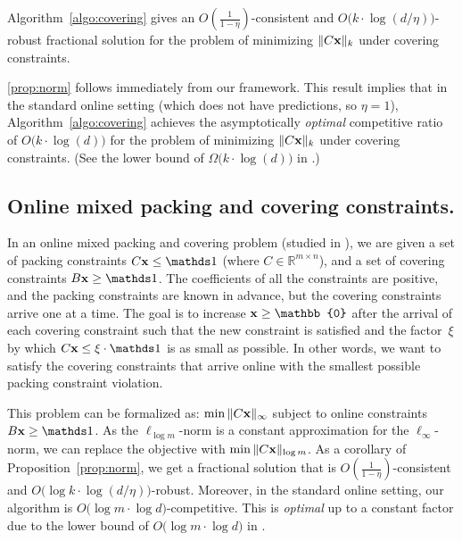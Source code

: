 \begin{proposition}	\label{prop:norm}
Algorithm~\ref{algo:covering} gives an
$O(\frac{1}{1 - \eta})$-consistent and $O\bigl( k \cdot \log (d/\eta)\bigr)$-robust fractional solution
for the problem of minimizing $\|C \mathbf{x}\|_{k}$ under covering constraints.
\end{proposition}

\cref{prop:norm} follows immediately from our framework.
This result implies that in the standard online setting (which does not have predictions, so $\eta = 1$), Algorithm~\ref{algo:covering}
achieves the asymptotically \emph{optimal} competitive ratio of  $O\bigl( k \cdot \log (d)\bigr)$
for the problem of minimizing $\|C \mathbf{x}\|_{k}$ under covering constraints. (See the lower bound
of $\Omega\bigl( k \cdot \log (d)\bigr)$ in \cite{AzarCohen14:Online-Covering}.)

\subsection{Online mixed packing and covering constraints.}
In an online mixed packing and covering problem (studied in \cite{AzarBhaskar13:Online-mixed}),
we are given a set of packing constraints $C \vect{x} \leq \one$ (where $C \in \mathbb{R}^{m \times n}$),
and a set of covering constraints $B \vect{x} \geq \one$. The coefficients of all the constraints are positive,
and the packing constraints are known in advance, but the covering constraints arrive one at a time.
The goal is to increase $\vect{x} \geq \mathbb{0}$ after the arrival of each covering constraint
such that the new constraint is satisfied and the factor~$\xi$ by which $C \vect{x} \leq \xi \cdot \one$ is as small as possible. In other words, we want to satisfy the covering constraints that arrive online with the smallest possible packing constraint violation.

This problem can be formalized as: $\min \| C \mathbf{x}\|_{\infty}$ subject to online constraints $B \vect{x} \geq \one$.
As the $\ell_{\log m}$-norm is a constant approximation for the $\ell_{\infty}$-norm, we can replace the objective with $\min \| C \mathbf{x}\|_{\log m}$.
As a corollary of Proposition~\ref{prop:norm}, we get a fractional solution that is
$O(\frac{1}{1 - \eta})$-consistent and $O\bigl( \log k \cdot \log (d/\eta)\bigr)$-robust.
Moreover, in the standard online setting, our algorithm is $O\bigl( \log m \cdot \log d \bigr)$-competitive. This is \emph{optimal} up to a constant factor
due to the lower bound of $O\bigl( \log m \cdot \log d \bigr)$ in \cite{AzarBhaskar13:Online-mixed}.
